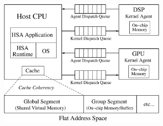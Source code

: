 \documentclass[12pt]{article}
\begin{document}
\begin{CJK}{UTF8}{bkai}
\begin{figure}[!ht]
            \centering
            \includegraphics[width=0.75\textwidth]{./figs/systemspec.eps}
            \label{fig:systemspec}
        \end{figure}

\end{CJK}
\end{document}
